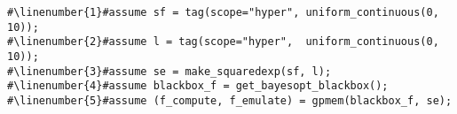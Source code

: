 \begin{mdframed}
\begin{minipage}{\linewidth}
\small
\belowcaptionskip=-10pt
\begin{lstlisting}[caption={Initialize \gpmem\ for Bayesian
optimization},mathescape,numbers=none,label=alg:init_bayesopt,escapechar=\#]
#\linenumber{1}#assume sf = tag(scope="hyper", uniform_continuous(0, 10));
#\linenumber{2}#assume l = tag(scope="hyper",  uniform_continuous(0, 10));
#\linenumber{3}#assume se = make_squaredexp(sf, l);
#\linenumber{4}#assume blackbox_f = get_bayesopt_blackbox();
#\linenumber{5}#assume (f_compute, f_emulate) = gpmem(blackbox_f, se);
\end{lstlisting}

\end{minipage}
\end{mdframed}
